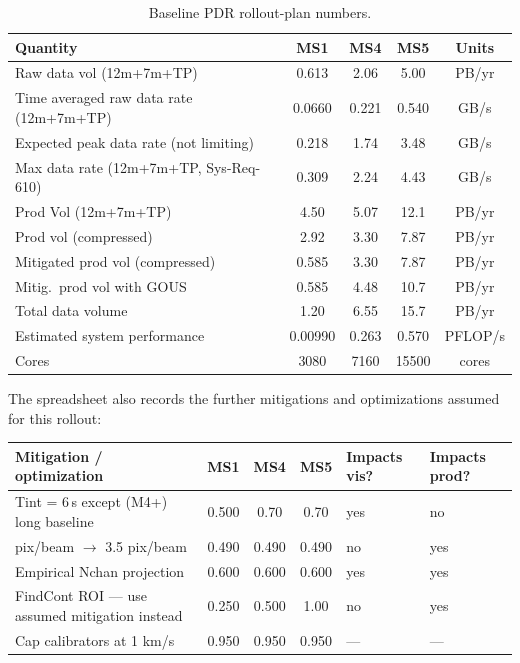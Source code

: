 \documentclass[11pt]{article}
\begin{document}
\begin{table}[p]
\centering
\caption{Baseline PDR rollout-plan numbers.}
\label{tab:rollout-pdr}
\small
\setlength{\tabcolsep}{4pt}
\begin{tabular}{>{\raggedright\arraybackslash}p{2.9in}cccc}
\toprule
Quantity & MS1 & MS4 & MS5 & Units \\
\midrule
Raw data vol (12m+7m+TP) & 0.613 & 2.06 & 5.00 & PB/yr \\
Time averaged raw data rate (12m+7m+TP) & 0.0660 & 0.221 & 0.540 & GB/s \\
Expected peak data rate (not limiting) & 0.218 & 1.74 & 3.48 & GB/s \\
Max data rate (12m+7m+TP, Sys-Req-610) & 0.309 & 2.24 & 4.43 & GB/s \\
Prod Vol (12m+7m+TP) & 4.50 & 5.07 & 12.1 & PB/yr \\
Prod vol (compressed) & 2.92 & 3.30 & 7.87 & PB/yr \\
Mitigated prod vol (compressed) & 0.585 & 3.30 & 7.87 & PB/yr \\
Mitig.\ prod vol with GOUS & 0.585 & 4.48 & 10.7 & PB/yr \\
Total data volume & 1.20 & 6.55 & 15.7 & PB/yr \\
Estimated system performance & 0.00990 & 0.263 & 0.570 & PFLOP/s \\
Cores & 3080 & 7160 & 15500 & cores \\
\bottomrule
\end{tabular}
\end{table}

The spreadsheet also records the further mitigations and optimizations assumed
for this rollout:

\begin{center}
\small
\setlength{\tabcolsep}{4pt}
\begin{tabular}{>{\raggedright\arraybackslash}p{2.8in}cccll}
\toprule
Mitigation / optimization & MS1 & MS4 & MS5 & Impacts vis? & Impacts prod? \\
\midrule
Tint = 6\,s except (M4+) long baseline & 0.500 & 0.70 & 0.70 & yes & no \\
5 pix/beam $\rightarrow$ 3.5 pix/beam & 0.490 & 0.490 & 0.490 & no & yes \\
Empirical Nchan projection & 0.600 & 0.600 & 0.600 & yes & yes \\
FindCont ROI --- use assumed mitigation instead & 0.250 & 0.500 & 1.00 & no & yes \\
Cap calibrators at 1 km/s & 0.950 & 0.950 & 0.950 & --- & --- \\
\bottomrule
\end{tabular}
\end{center}
\end{document}
